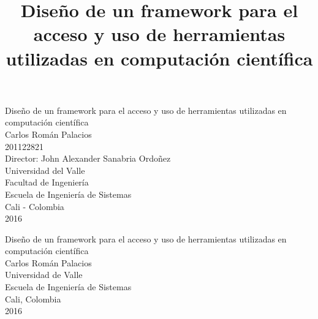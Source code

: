\title{Diseño de un framework para el acceso y uso de herramientas utilizadas en computación científica}
\begin{titlepage}
\begin{center}

\huge Diseño de un framework para el acceso y uso de herramientas utilizadas en computación científica\\[5.0cm]

\Large Carlos Román Palacios\\[1em]
\Large 201122821\\[1em]
\large Director: John Alexander Sanabria Ordoñez\\[3.0cm]
Universidad del Valle\\[1em]
Facultad de Ingeniería\\[1em]
Escuela de Ingeniería de Sistemas\\[1em]
Cali - Colombia \\[1em]
2016\\[1em]

\end{center}
\end{titlepage}
\newpage{\pagestyle{empty}}

\begin{center}
\huge
Diseño de un framework para el acceso y uso de herramientas utilizadas en computación científica\\[5.0cm]
\Large Carlos Román Palacios\\[6.0cm]


Universidad de Valle\\
Escuela de Ingeniería de Sistemas\\
Cali, Colombia\\
2016\\
\end{center}